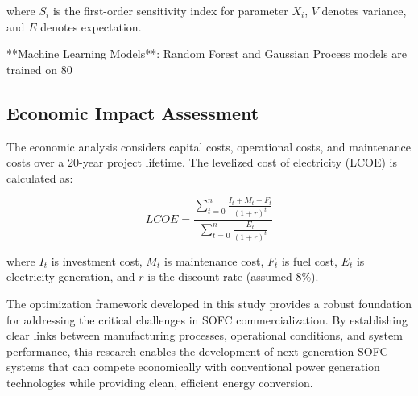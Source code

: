 \documentclass[10pt,conference]{IEEEtran}
\begin{document}
where $S_i$ is the first-order sensitivity index for parameter $X_i$, $V$ denotes variance, and $E$ denotes expectation.

**Machine Learning Models**: Random Forest and Gaussian Process models are trained on 80%

\subsection{Economic Impact Assessment}

The economic analysis considers capital costs, operational costs, and maintenance costs over a 20-year project lifetime. The levelized cost of electricity (LCOE) is calculated as:

\begin{equation}
LCOE = \frac{\sum_{t=0}^{n} \frac{I_t + M_t + F_t}{(1+r)^t}}{\sum_{t=0}^{n} \frac{E_t}{(1+r)^t}}
\end{equation}

where $I_t$ is investment cost, $M_t$ is maintenance cost, $F_t$ is fuel cost, $E_t$ is electricity generation, and $r$ is the discount rate (assumed 8\%).

The optimization framework developed in this study provides a robust foundation for addressing the critical challenges in SOFC commercialization. By establishing clear links between manufacturing processes, operational conditions, and system performance, this research enables the development of next-generation SOFC systems that can compete economically with conventional power generation technologies while providing clean, efficient energy conversion.
\end{document}
